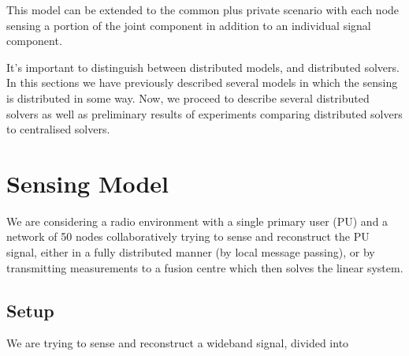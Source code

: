 \documentclass{article}
\begin{document}
This model can be extended to the common plus private scenario with each node sensing a portion of the joint component in addition to an individual signal component.

It's important to distinguish between distributed models, and distributed solvers. In this sections we have previously described several models in which the sensing is distributed in some way. Now, we proceed to describe several distributed solvers as well as preliminary results of experiments comparing distributed solvers to centralised solvers.

\section{Sensing Model}
We are considering a radio environment with a single primary user (PU) and a network of 50 nodes collaboratively trying to sense and reconstruct the PU signal, either in a fully distributed manner (by local message passing), or by transmitting measurements to a fusion centre which then solves the linear system. 

\subsection{Setup}
We are trying to sense and reconstruct a wideband signal, divided into 
\end{document}
